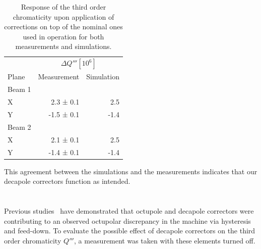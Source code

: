   
  \begin{table}[!htb]
    \centering
    \begin{tabular}{lrr}
      \toprule
           & \multicolumn{2}{c}{$\Delta Q''' [10^6]$}\\
       Plane         & Measurement   & Simulation \\
      \midrule
        Beam 1  &    & \\
        \hspace{2mm}X       &  2.3 ± 0.1 &   2.5 \\
        \hspace{2mm}Y       & -1.5 ± 0.1 &  -1.4 \\
        Beam 2  &            &  \\
        \hspace{2mm}X       & 2.1 ± 0.1  &  2.5\\
        \hspace{2mm}Y       & -1.4 ± 0.1 & -1.4\\
        \bottomrule
    \end{tabular}
    \caption{Response of the third order chromaticity upon application of corrections on top of the
    nominal ones used in operation for both measurements and simulations.}
    \label{table:decapoles:chromaticity:dq3_before_after_beam_based_response}
  \end{table}


This agreement between the simulations and the measurements indicates that our decapole correctors
function as intended.



\section{}



Previous studies~\cite{maclean_measurement_2014} have demonstrated that octupole and decapole
correctors were contributing to an observed octupolar discrepancy in the machine via hysteresis and
feed-down. To evaluate the possible effect of decapole correctors on the third order chromaticity
$Q'''$, a measurement was taken with these elements turned off.


